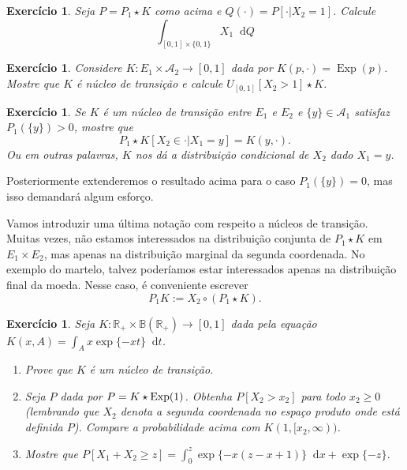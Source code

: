 \documentclass[reqno, final]{book}
\newcommand*\1{\mathds{1}}
\newtheorem{exercise}[example]{Exercício}
\DeclareMathOperator{\Exp}{Exp}
\renewcommand*\d{\mathop{}\!\mathrm{d}}
\begin{document}
\begin{exercise}
  Seja $P = P_1 \star K$ como acima e $Q(\cdot) = P[\cdot | X_2 = 1]$.
  Calcule
  \begin{equation}
    \int_{[0,1] \times \{0,1\}} X_1 \d Q
  \end{equation}
\end{exercise}

\begin{exercise}
  Considere $K:E_1 \times \mathcal{A}_2 \to [0,1]$ dada por $K(p, \cdot) = \Exp(p)$.
  Mostre que $K$ é núcleo de transição e calcule $U_{[0,1]}[X_2 > 1] \star K$.
\end{exercise}

\begin{exercise}
  Se $K$ é um núcleo de transição entre $E_1$ e $E_2$ e $\{y\} \in \mathcal{A}_1$ satisfaz $P_1(\{y\}) > 0$, mostre que
  \begin{equation}
    P_1 \star K [X_2 \in \cdot | X_1 = y] = K(y, \cdot).
  \end{equation}
  Ou em outras palavras, $K$ nos dá a distribuição condicional de $X_2$ dado $X_1 = y$.
\end{exercise}

Posteriormente extenderemos o resultado acima para o caso $P_1(\{y\}) = 0$, mas isso demandará algum esforço.

Vamos introduzir uma última notação com respeito a núcleos de transição.
Muitas vezes, não estamos interessados na distribuição conjunta de $P_1 \star K$ em $E_1 \times E_2$, mas apenas na distribuição marginal da segunda coordenada.
No exemplo do martelo, talvez poderíamos estar interessados apenas na distribuição final da moeda.
Nesse caso, é conveniente escrever
\begin{equation}
  \label{e:P1_K}
  P_1 K := X_2 \circ (P_1 \star K).
\end{equation}

\begin{exercise}
  Seja $K:\mathbb{R}_+ \times \mathbb{B}(\mathbb{R}_+) \to [0,1]$ dada pela equação $K(x,A) = \int_A x \exp\{-x t\} \d t$.
  \begin{enumerate}[\quad a)]
  \item Prove que $K$ \'e um n\'ucleo de transi\c{c}\~ao.
  \item Seja $P$ dada por $P = K \star \textnormal{Exp}(1)$.
    Obtenha $P[X_2 > x_2]$ para todo $x_2 \geq 0$ (lembrando que $X_2$ denota a segunda coordenada no espa\c{c}o produto onde est\'a definida $P$).
    Compare a probabilidade acima com $K(1,[x_2, \infty))$.
  \item Mostre que $P[X_1 + X_2 \geq z] = \int_0^z \exp \{-x(z-x+1)\} \d x + \exp\{-z\}$.
  \end{enumerate}
\end{exercise}
\end{document}

